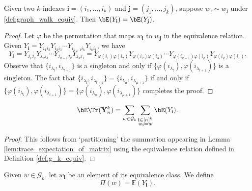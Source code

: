 \begin{lemma}[$\mathbf{i} \sim \mathbf{j} \Rightarrow \mathbb{E}(Y_\mathbf{i}) = \mathbb{E}(Y_\mathbf{j})$ : R-1-7 : lem:eq\_equiv\_eq\_expect]
  \label{lem:eq_equiv_eq_expect}
  Given two $k$-indexes $\mathbf{i} = (i_1,...,i_k)$ and $\mathbf{j} = (j_1,...,j_k)$,
  suppose $w_{\mathbf{i}} \sim w_{\mathbf{j}}$ under \ref{def:graph_walk_equiv}.
  Then $\bE (Y_\mathbf{i}) = \bE (Y_{\mathbf{j}})$.
\end{lemma}

\begin{proof}
  Let $\varphi$ be the permutation that maps $w_\mathbf{i}$ to $w_{\mathbf{j}}$ in the equivalence
  relation. Given $Y_\mathbf{i} = Y_{i_1 i_2}Y_{i_2 i_3} \cdots Y_{i_{k-1} i_k}Y_{i_k i_1}$, we have
  \[
  Y_{\mathbf{j}} = Y_{j_1 j_2}Y_{j_2 j_3} \cdots Y_{j_{k-1} j_k}Y_{j_k j_1}
  = Y_{\varphi(i_1) \varphi(i_2)}Y_{\varphi(i_2) \varphi(i_3)} \cdots Y_{\varphi(i_{k-1}) \varphi(i_k)}Y_{\varphi(i_k) \varphi(i_1)}.
  \]
  Observe that $\{ i_{\lambda_l},i_{\lambda_{l+1}} \}$ is a singleton and only if
  $\{ \varphi(i_{\lambda_l}),\varphi(i_{\lambda_{l+1}}) \}$ is a singleton.
  The fact that $\{ i_{\lambda_l},i_{\lambda_{l+1}} \} = \{ i_{\lambda_\mu},i_{\lambda_{\mu+1}} \}$
  if and only if $\{ \varphi(i_{\lambda_l}),\varphi(i_{\lambda_{l+1}}) \} = \{ \varphi(i_{\lambda_\mu}),\varphi(i_{\lambda_{\mu+1}}) \}$
  completes the proof.
\end{proof}


\begin{lemma}
  \label{lem:equation_4.5_1}
  \[
  \bE \Tr (\mathbf{Y}_n^k)
  = \sum_{w \in \mathcal{G}_k} \sum_{\substack{\mathbf{i} \in [n]^k \\ w_\mathbf{i} = w}} \bE (Y_\mathbf{i}).
  \]
\end{lemma}

\begin{proof}
  This follows from `partitioning' the summation appearing in Lemma \ref{lem:trace_expectation_of_matrix} using the equivalence relation defined in Definition \ref{def:g_k_equiv}.
\end{proof}


\begin{definition}[$\Pi (G,w)$: R-1-11 : def:Pi.G.w]
  \label{def:Pi.G.w}
  Given $w \in \mathcal{G}_k$, let $w_{\mathbf{i}}$ be an element of its equivalence class. We define
  \[
  \Pi (w) = \mathbb{E}(Y_\mathbf{i}).
  \]
\end{definition}


